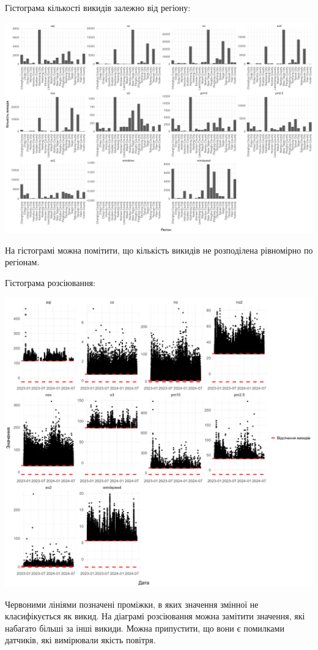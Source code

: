 \documentclass{article}
\begin{document}
\begin{enumerate}
    Гістограма кількості викидів залежно від регіону:

    \includegraphics[width=6in]{plots/outliers/count-bar-county.png}

    На гістограмі можна помітити, що кількість викидів не розподілена рівномірно
    по регіонам.

    \pagebreak

    Гістограма розсіювання:

    \includegraphics[width=6in]{plots/outliers/scatter.png}

    Червоними лініями позначені проміжки, в яких значення змінної не класифікується
    як викид. На діаграмі розсіювання можна замітити значення, які набагато більші за
    інші викиди. Можна припустити, що вони є помилками датчиків, які вимірювали якість
    повітря.


\end{enumerate}
\end{document}
